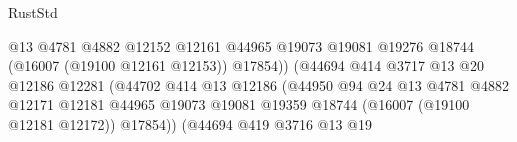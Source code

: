 \begin{lexlean}{RustStd}
\begin{coremodule}
                                                      @13
                                                      @4781
                                                      @4882
                                                      @12152
                                                      @12161
                                                      @44965
                                                      @19073
                                                      @19081
                                                      @19276
                                                      @18744
                                                      (@16007 (@19100 @12161 @12153))
                                                      @17854))
                                                  (@44694
                                                    @414
                                                    @3717
                                                    @13
                                                    @20
                                                    @12186
                                                    @12281
                                                    (@44702
                                                      @414
                                                      @13
                                                      @12186
                                                      (@44950
                                                        @94
                                                        @24
                                                        @13
                                                        @4781
                                                        @4882
                                                        @12171
                                                        @12181
                                                        @44965
                                                        @19073
                                                        @19081
                                                        @19359
                                                        @18744
                                                        (@16007 (@19100 @12181 @12172))
                                                        @17854))
                                                    (@44694
                                                      @419
                                                      @3716
                                                      @13
                                                      @19

\end{coremodule}
\end{lexlean}
